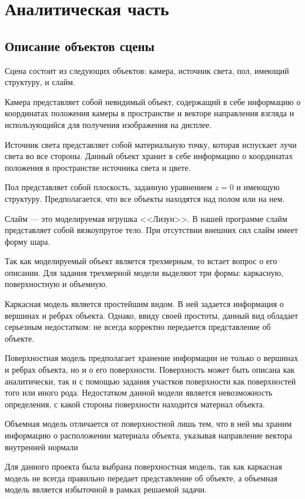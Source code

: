\chapter{Аналитическая часть}

\section{Описание объектов сцены}

Сцена состоит из следующих объектов: камера, источник света, пол, имеющий структуру, и слайм.

Камера представляет собой невидимый объект, содержащий в себе информацию о координатах положения камеры в пространстве и векторе направления взгляда и использующийся для получения изображения на дисплее.

Источник света представляет собой материальную точку, которая испускает лучи света во все стороны. Данный объект хранит в себе информацию о координатах положения в пространстве источника света и цвете.

Пол представляет собой плоскость, заданную уравнением $z = 0$ и имеющую структуру. Предполагается, что все объекты находятся над полом или на нем.

Слайм --- это моделируемая игрушка <<Лизун>>. В нашей программе слайм представляет собой вязкоупругое тело. При отсутствии внешних сил слайм имеет форму шара.

Так как моделируемый объект является трехмерным, то встает вопрос о его описании. Для задания трехмерной модели выделяют три формы: каркасную, поверхностную и объемную.

Каркасная модель является простейшим видом. В ней задается информация о вершинах и ребрах объекта. Однако, ввиду своей простоты, данный вид обладает серьезным недостатком: не всегда корректно передается представление об объекте.

Поверхностная модель предполагает хранение информации не только о вершинах и ребрах объекта, но и о его поверхности. Поверхность может быть описана как аналитически, так и с помощью задания участков поверхности как поверхностей того или иного рода. Недостатком данной модели является невозможность определения, с какой стороны поверхности находится материал объекта.

Объемная модель отличается от поверхностной лишь тем, что в ней мы храним информацию о расположении материала объекта, указывая направление вектора внутренней нормали

Для данного проекта была выбрана поверхностная модель, так как каркасная модель не всегда правильно передает представление об объекте, а объемная модель является избыточной в рамках решаемой задачи.

